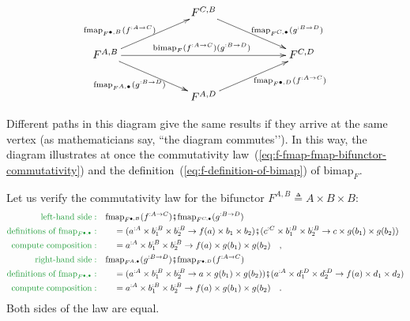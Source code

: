 \begin{wrapfigure}{l}{0.5\columnwidth}%
\vspace{-1.5\baselineskip}
\[
\xymatrix{\xyScaleY{2.0pc}\xyScaleX{5.0pc} & F^{C,B}\ar[rd]\sp(0.6){\ ~~\text{fmap}_{F^{C,\bullet}}(g^{:B\rightarrow D})}\\
F^{A,B}\ar[ru]\sp(0.4){\text{fmap}_{F^{\bullet,B}}(f^{:A\rightarrow C})~~~}\ar[rd]\sb(0.5){\text{fmap}_{F^{A,\bullet}}(g^{:B\rightarrow D})~~\ }\ar[rr]\sp(0.5){\text{bimap}_{F}(f^{:A\rightarrow C})(g^{:B\rightarrow D})\ } &  & F^{C,D}\\
 & F^{A,D}\ar[ru]\sb(0.6){~~~~\text{fmap}_{F^{\bullet,D}}(f^{:A\rightarrow C})}
}
\]

\vspace{-2.2\baselineskip}
\end{wrapfigure}%
Different paths in this diagram give the same results if they arrive
at the same vertex (as mathematicians say, \textsf{``}the diagram commutes\textsf{'}').
In this way, the diagram illustrates at once the commutativity law~(\ref{eq:f-fmap-fmap-bifunctor-commutativity})
and the definition~(\ref{eq:f-definition-of-bimap}) of $\text{bimap}_{F}$.

Let us verify the commutativity law for the bifunctor
$F^{A,B}\triangleq A\times B\times B$:
\begin{align*}
{\color{greenunder}\text{left-hand side}:}\quad & \text{fmap}_{F^{\bullet,B}}(f^{:A\rightarrow C})\bef\text{fmap}_{F^{C,\bullet}}(g^{:B\rightarrow D})\\
{\color{greenunder}\text{definitions of }\text{fmap}_{F^{\bullet,\bullet}}:}\quad & \quad=(a^{:A}\times b_{1}^{:B}\times b_{2}^{:B}\rightarrow f(a)\times b_{1}\times b_{2})\bef(c^{:C}\times b_{1}^{:B}\times b_{2}^{:B}\rightarrow c\times g(b_{1})\times g(b_{2}))\\
{\color{greenunder}\text{compute composition}:}\quad & \quad=a^{:A}\times b_{1}^{:B}\times b_{2}^{:B}\rightarrow f(a)\times g(b_{1})\times g(b_{2})\quad,\\
{\color{greenunder}\text{right-hand side}:}\quad & \text{fmap}_{F^{A,\bullet}}(g^{:B\rightarrow D})\bef\text{fmap}_{F^{\bullet,D}}(f^{:A\rightarrow C})\\
{\color{greenunder}\text{definitions of }\text{fmap}_{F^{\bullet,\bullet}}:}\quad & \quad=(a^{:A}\times b_{1}^{:B}\times b_{2}^{:B}\rightarrow a\times g(b_{1})\times g(b_{2}))\bef(a^{:A}\times d_{1}^{:D}\times d_{2}^{:D}\rightarrow f(a)\times d_{1}\times d_{2})\\
{\color{greenunder}\text{compute composition}:}\quad & \quad=a^{:A}\times b_{1}^{:B}\times b_{2}^{:B}\rightarrow f(a)\times g(b_{1})\times g(b_{2})\quad.
\end{align*}
Both sides of the law are equal.

